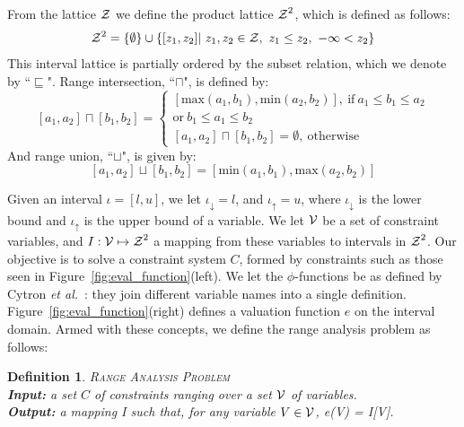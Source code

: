 \documentclass[preprint]{sigplanconf}[10pt]
\newtheorem{definition}[section]{Definition}
\newcommand{\lb}[1]{#1_{\downarrow}}
\newcommand{\ub}[1]{#1_{\uparrow}}
\newcommand{\varset}[1]{\mbox{$\cal{#1}$}}
\begin{document}
From the lattice $\varset{Z}$ we define the product lattice
$\varset{Z}^2$, which is defined as follows:
%
\begin{equation*}
\varset{Z}^2 = \{ \emptyset \} \cup \{[z_1, z_2] | \ z_1,z_2 \in \varset{Z},
\ z_1 \leq z_2, \  -\infty < z_2 \}
\end{equation*}
%
This interval lattice is partially ordered by the subset relation, which we
denote by ``$\sqsubseteq$".
Range intersection, ``$\sqcap$", is defined by:
\[
[a_1, a_2] \sqcap [b_1, b_2] =
\begin{cases}
[\mbox{max}(a_1, b_1), \mbox{min}(a_2, b_2)], \ \mbox{if} \ a_1 \leq b_1 \leq a_2  \\ \mbox{or} \ b_1 \leq a_1 \leq b_2 \\
[a_1, a_2] \sqcap [b_1, b_2] = \emptyset, \ \mbox{otherwise}
\end{cases}
\]
And range union, ``$\sqcup$", is given by:
\[
[a_1, a_2] \sqcup [b_1, b_2] = [\mbox{min}(a_1, b_1), \mbox{max}(a_2, b_2)]
\]

Given an interval $\iota = [l, u]$, we let $\lb{\iota} = l$, and
$\ub{\iota} = u$, where $\lb{\iota}$ is the lower bound and $\ub{\iota}$ is
the upper bound of a variable.
We let \varset{V} be a set of constraint variables, and
$I: \varset{V} \mapsto \varset{Z}^2$ a
mapping from these variables to intervals in $\varset{Z}^2$.
Our objective is to solve a constraint system $C$, formed by constraints such
as those seen in Figure~\ref{fig:eval_function}(left).
We let the $\phi$-functions be as defined by Cytron
{\em et al.}~\cite{Cytron91}: they join different variable names into a single
definition.
Figure~\ref{fig:eval_function}(right) defines a valuation function $e$ on the
interval domain.
Armed with these concepts, we define the range analysis problem as follows:

\begin{definition}
\label{def:rcp}
\textsc{Range Analysis Problem} \\
\textbf{Input:} a set $C$ of constraints ranging over a set \varset{V} of
variables. \\
\textbf{Output:} a mapping I such that, for any variable
$V \in \varset{V}$, e(V) = I[V].
\end{definition}
\end{document}
